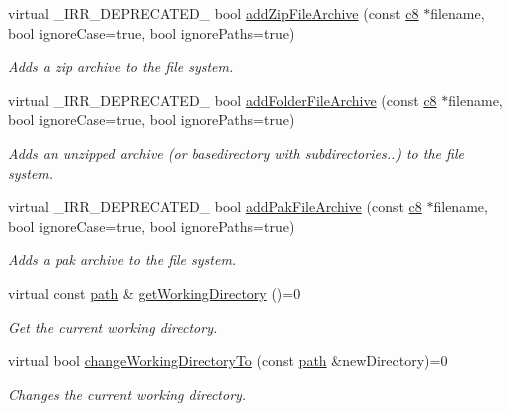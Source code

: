 \begin{DoxyCompactItemize}
virtual \+\_\+\+I\+R\+R\+\_\+\+D\+E\+P\+R\+E\+C\+A\+T\+E\+D\+\_\+ bool \hyperlink{classirr_1_1io_1_1IFileSystem_aef11ff9b5c171d7b3a99d8a79b71f2b3}{add\+Zip\+File\+Archive} (const \hyperlink{namespaceirr_a9395eaea339bcb546b319e9c96bf7410}{c8} $\ast$filename, bool ignore\+Case=true, bool ignore\+Paths=true)
\begin{DoxyCompactList}\small\item\em Adds a zip archive to the file system. \end{DoxyCompactList}\item 
virtual \+\_\+\+I\+R\+R\+\_\+\+D\+E\+P\+R\+E\+C\+A\+T\+E\+D\+\_\+ bool \hyperlink{classirr_1_1io_1_1IFileSystem_a7b5235a1473ff67d97f1487211762723}{add\+Folder\+File\+Archive} (const \hyperlink{namespaceirr_a9395eaea339bcb546b319e9c96bf7410}{c8} $\ast$filename, bool ignore\+Case=true, bool ignore\+Paths=true)
\begin{DoxyCompactList}\small\item\em Adds an unzipped archive (or basedirectory with subdirectories..) to the file system. \end{DoxyCompactList}\item 
virtual \+\_\+\+I\+R\+R\+\_\+\+D\+E\+P\+R\+E\+C\+A\+T\+E\+D\+\_\+ bool \hyperlink{classirr_1_1io_1_1IFileSystem_a5ade21d59a80b16965d57d1977ad6cc4}{add\+Pak\+File\+Archive} (const \hyperlink{namespaceirr_a9395eaea339bcb546b319e9c96bf7410}{c8} $\ast$filename, bool ignore\+Case=true, bool ignore\+Paths=true)
\begin{DoxyCompactList}\small\item\em Adds a pak archive to the file system. \end{DoxyCompactList}\item 
virtual const \hyperlink{namespaceirr_1_1io_ab1bdc45edb3f94d8319c02bc0f840ee1}{path} \& \hyperlink{classirr_1_1io_1_1IFileSystem_acbf7342afa6e2fc9583db3e521e66e61}{get\+Working\+Directory} ()=0
\begin{DoxyCompactList}\small\item\em Get the current working directory. \end{DoxyCompactList}\item 
virtual bool \hyperlink{classirr_1_1io_1_1IFileSystem_a8859a2bed44815eeccc4fbcef189b073}{change\+Working\+Directory\+To} (const \hyperlink{namespaceirr_1_1io_ab1bdc45edb3f94d8319c02bc0f840ee1}{path} \&new\+Directory)=0
\begin{DoxyCompactList}\small\item\em Changes the current working directory. \end{DoxyCompactList}\item 

\end{DoxyCompactItemize}
